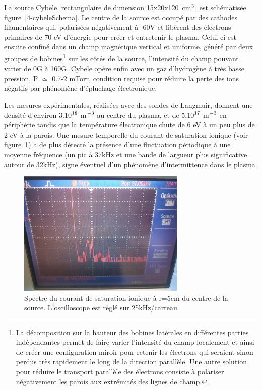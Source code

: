 \begin{refsection}
La source Cybele, rectangulaire de dimension 
15x20x120~cm$^{{3}}$, est schématisée 
figure~\ref{4-cybeleSchema}. Le centre de la source est
occupé par des cathodes filamentaires qui, polarisées négativement à -60V et
libèrent des électrons primaires de 70 eV
d'énergie pour créer et entretenir le plasma.
Celui-ci est ensuite confiné dans un champ magnétique vertical et uniforme, généré par deux
groupes de bobines\footnote{La décomposition sur la hauteur des bobines
latérales en différentes parties indépendantes permet de faire varier l'intensité du champ
localement et ainsi de créer une configuration miroir pour retenir les
électrons qui seraient sinon perdus très rapidement le long de la direction
parallèle. Une autre solution pour réduire le transport parallèle des électrons
consiste à polariser négativement les parois aux extrémités des lignes de
champ.} sur les côtés de la source, l'intensité du champ pouvant varier de 0G à
160G. Cybele opère enfin avec un gaz d'hydrogène à très basse pression,
P $\simeq$ 0.7-2 mTorr, condition requise pour réduire la perte des ions
négatifs par phénomène d'épluchage électronique.

Les mesures expérimentales, réalisées avec des sondes de Langmuir, donnent une
densité d'environ 3.10$^{{18}}$ m$^{{-3}}$ au centre du plasma, et
de 5.10$^{{17}}$ m$^{{-3}}$ en périphérie tandis que la
température électronique chute de 6 eV à un peu plus de 2 eV à la parois. Une mesure
temporelle du courant de saturation ionique (voir
figure~\ref{4-CybeleFourierSignal}) a de plus détecté la
présence d'une fluctuation périodique à une moyenne fréquence (un pic à
37kHz et une bande de largueur plus significative autour de 32kHz), signe
éventuel d'un phénomène d'intermittence dans le plasma.

\begin{figure}[!htbp]
  \centering
    \includegraphics[height=6cm]{figures/4-CybeleFourierSignal.jpg}
    \caption{Spectre du courant de saturation
    ionique à r=5cm du centre de la source.
    L'oscilloscope est réglé sur 25kHz/carreau.\label{4-CybeleFourierSignal}}
\end{figure}


\end{refsection}
